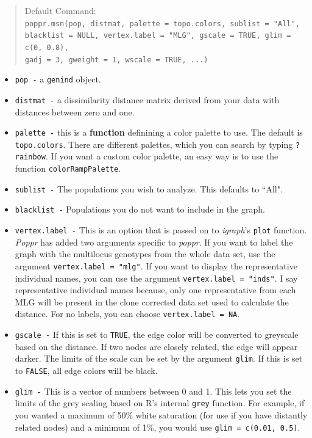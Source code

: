 \documentclass[letterpaper]{article}
\newcommand{\tab}{\hspace*{1em}}
\begin{document}
\begin{quote}
Default Command:\\
\texttt{poppr.msn(pop, distmat, palette = topo.colors, sublist = "All",\\ 
  \tab blacklist = NULL, vertex.label = "MLG", gscale = TRUE, glim = c(0, 0.8),\\ 
  \tab gadj = 3, gweight = 1, wscale = TRUE, ...)
}
\end{quote}
\begin{itemize}
  \item \texttt{pop -} a \texttt{genind} object.
  \item \texttt{distmat -} a dissimilarity distance matrix derived from your data with distances between zero and one.
  \item \texttt{palette -} this is a \textbf{function} definining a color palette to use. The default is \texttt{topo.colors}. There are different palettes, which you can search by typing \texttt{?rainbow}. If you want a custom color palette, an easy way is to use the function \texttt{colorRampPalette}.
  \item \texttt{sublist -} The populations you wish to analyze. This defaults to ``All".
  \item \texttt{blacklist -} Populations you do not want to include in the graph.
  \item \texttt{vertex.label -} This is an option that is passed on to \textit{igraph}'s \texttt{plot} function. \textit{Poppr} has added two arguments specific to \textit{poppr}. If you want to label the graph with the multilocus genotypes from the whole data set, use the argument \texttt{vertex.label = "mlg"}. If you want to display the representative individual names, you can use the argument \texttt{vertex.label = "inds"}. I say representative individual names because, only one representative from each MLG will be present in the clone corrected data set used to calculate the distance. For no labels, you can choose \texttt{vertex.label = NA}. 
  \item \texttt{gscale -} If this is set to \texttt{TRUE}, the edge color will be converted to greyscale based on the distance. If two nodes are closely related, the edge will appear darker. The limits of the scale can be set by the argument \texttt{glim}. If this is set to \texttt{FALSE}, all edge colors will be black. 
  \item \texttt{glim -} This is a vector of numbers between 0 and 1. This lets you set the limits of the grey scaling based on R's internal \texttt{grey} function. For example, if you wanted a maximum of 50\% white saturation (for use if you have distantly related nodes) and a minimum of 1\%, you would use \texttt{glim = c(0.01, 0.5)}. 

\end{itemize}
\end{document}

